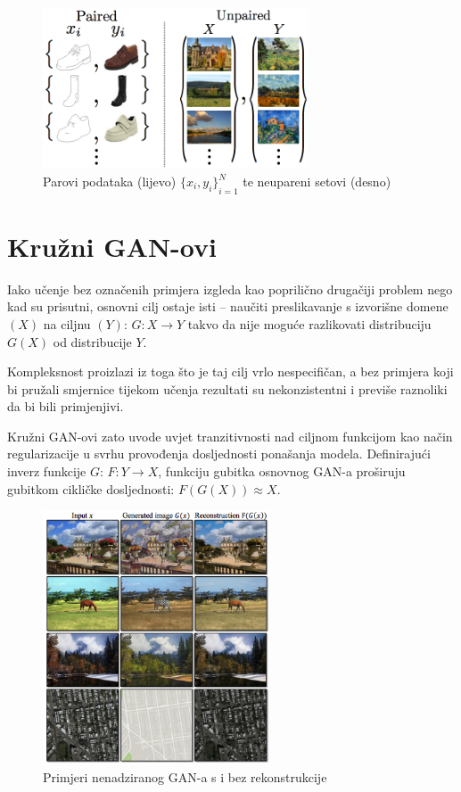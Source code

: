 \documentclass[lmodern, utf8, seminar]{fer}
\begin{document}
\begin{figure}[H]
    \centering
    \includegraphics[width=0.7\textwidth]{zhu2017unpaired-paired-vs-unpaired}
    \caption{Parovi podataka (lijevo) ${\{x_i,y_i\}}_{i=1}^N$ te neupareni setovi (desno) \cite{zhu2017unpaired}}
    \label{fig:zhu2017unpaired-paired-vs-unpaired}
\end{figure}

\newpage
\section{Kružni GAN-ovi}
Iako učenje bez označenih primjera izgleda kao poprilično drugačiji problem nego kad su prisutni, osnovni cilj ostaje isti -- naučiti preslikavanje s izvorišne domene $(X)$ na ciljnu $(Y)$: $G: X\rightarrow Y$ takvo da nije moguće razlikovati distribuciju $G(X)$ od distribucije $Y$. 

Kompleksnost proizlazi iz toga što je taj cilj vrlo nespecifičan, a bez primjera koji bi pružali smjernice tijekom učenja rezultati su nekonzistentni i previše raznoliki da bi bili primjenjivi.

Kružni GAN-ovi zato uvode uvjet tranzitivnosti nad ciljnom funkcijom kao način regularizacije u svrhu provođenja dosljednosti ponašanja modela.
Definirajući inverz funkcije $G$: $F: Y \rightarrow X$, funkciju gubitka osnovnog GAN-a proširuju gubitkom cikličke dosljednosti: $F(G(X)) \approx X$.

\begin{figure}[H]
    \centering
    \includegraphics[width=0.6\textwidth]{zhu2017unpaired-reconstruction}
    \caption{Primjeri nenadziranog GAN-a s i bez rekonstrukcije \cite{zhu2017unpaired}}
    \label{fig:zhu2017unpaired-reconstruction}
\end{figure}
\end{document}
